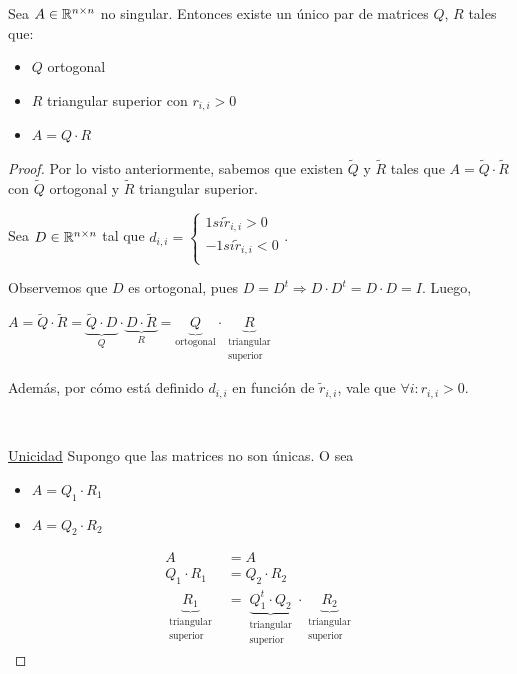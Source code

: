 \documentclass[]{article}
\begin{document}
\begin{prop}
	Sea $A\in\mathbb{R}^{n\times n}$ no singular. Entonces existe un único par de matrices $Q$, $R$ tales que:
	\begin{itemize}
		\item $Q$ ortogonal
		\item $R$ triangular superior con $r_{i,i} > 0$
		\item $A = Q\cdot R$
	\end{itemize}
	\begin{proof}
		Por lo visto anteriormente, sabemos que existen $\tilde Q$ y $\tilde R$ tales que $A=\tilde Q\cdot \tilde R$ con $\tilde Q$ ortogonal y $\tilde R$ triangular superior.

		Sea $D\in\mathbb{R}^{n\times n}$ tal que $d_{i,i}=\begin{cases}
			1 si \tilde r_{i,i} > 0\\
			-1 si \tilde r_{i,i} < 0\\
		\end{cases}$.

		Observemos que $D$ es ortogonal, pues $D = D^t \Rightarrow D\cdot D^t = D\cdot D = I$. Luego,
		\begin{center}
			$A=\tilde Q\cdot\tilde R = \underbrace{\tilde Q \cdot D}_{Q}\cdot \underbrace{D\cdot \tilde R}_{R} = \underbrace{Q}_\text{ortogonal}\cdot \underbrace{R}_{\substack{\text{triangular}\\\text{superior}}}$
		\end{center}

		Además, por cómo está definido $d_{i,i}$ en función de $\tilde r_{i,i}$, vale que $\forall i : r_{i,i}>0$.

		~\newline

		\underline{Unicidad}
		Supongo que las matrices no son únicas. O sea
		\begin{itemize}
			\item $A = Q_1\cdot R_1$
			\item $A = Q_2\cdot R_2$
		\end{itemize}

		\begin{align*}
			A&=A\\
			Q_1\cdot R_1 &= Q_2 \cdot R_2\\
			\underbrace{R_1}_{\substack{\text{triangular}\\\text{superior}}} &= \underbrace{Q_1^t \cdot Q_2}_{\substack{\text{triangular}\\\text{superior}}} \cdot \underbrace{R_2}_{\substack{\text{triangular}\\\text{superior}}}
		\end{align*}


\end{proof}
\end{prop}
\end{document}
